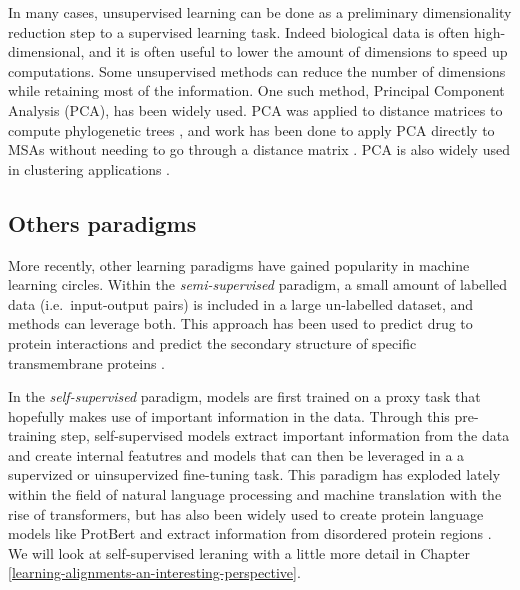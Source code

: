 \documentclass[
  11pt,
  twoside,
  BCOR=10mm,
  listof=totoc]{scrbook}
\begin{document}
In many cases, unsupervised learning can be done as a preliminary dimensionality reduction step to a supervised learning task. Indeed biological data is often high-dimensional, and it is often useful to lower the amount of dimensions to speed up computations. Some unsupervised methods can reduce the number of dimensions while retaining most of the information. One such method, Principal Component Analysis (PCA), has been widely used. PCA was applied to distance matrices to compute phylogenetic trees \autocite{haschkaMNHNTreeToolsToolboxTree2021}, and work has been done to apply PCA directly to MSAs without needing to go through a distance matrix \autocite{konishiPrincipalComponentAnalysis2019}. PCA is also widely used in clustering applications \autocite{ben-hurDetectingStableClusters2003,dingKmeansClusteringPrincipal2004,casariSequencespaceToolFamily1995,clampJalviewJavaAlignment2004}.

\hypertarget{others-paradigms}{%
\subsection{Others paradigms}\label{others-paradigms}}

More recently, other learning paradigms have gained popularity in machine learning circles. Within the \emph{semi-supervised} paradigm, a small amount of labelled data (i.e.~input-output pairs) is included in a large un-labelled dataset, and methods can leverage both. This approach has been used to predict drug to protein interactions \autocite{xiaSemisupervisedDrugproteinInteraction2010} and predict the secondary structure of specific transmembrane proteins \autocite{tamposisSemisupervisedLearningHidden2019}.

In the \emph{self-supervised} paradigm, models are first trained on a proxy task that hopefully makes use of important information in the data. Through this pre-training step, self-supervised models extract important information from the data and create internal featutres and models that can then be leveraged in a a supervized or uinsupervized fine-tuning task. This paradigm has exploded lately within the field of natural language processing and machine translation with the rise of transformers, but has also been widely used to create protein language models like ProtBert \autocite{elnaggarProtTransCrackingLanguage2021} and extract information from disordered protein regions \autocite{luDiscoveringMolecularFeatures2022}. We will look at self-supervised leraning with a little more detail in Chapter \ref{learning-alignments-an-interesting-perspective}.
\end{document}
